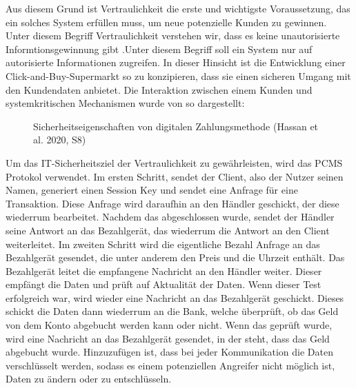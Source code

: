 Aus diesem Grund ist Vertraulichkeit die erste und wichtigste Voraussetzung, das ein solches System 
erfüllen muss, um neue potenzielle Kunden zu gewinnen. Unter diesem Begriff Vertraulichkeit verstehen wir, 
dass es keine unautorisierte Informtionsgewinnung gibt \cite{refbook:SWIS} .Unter diesem Begriff soll
ein System nur auf autorisierte Informationen zugreifen. In dieser Hinsicht ist die Entwicklung 
einer Click-and-Buy-Supermarkt so zu konzipieren, dass sie einen sicheren Umgang mit den Kundendaten
anbietet. Die Interaktion zwischen einem Kunden und systemkritischen Mechanismen wurde von
\cite{refart:HARE} so dargestellt:

\vfill
\begin{figure}[htb]
    \caption{Sicherheitseigenschaften von digitalen Zahlungsmethode (Hassan et al. 2020, S8)}
    \label{fig:refark_HARE}
\end{figure}
\vfill


Um das IT-Sicherheitsziel der Vertraulichkeit zu gewährleisten, wird das PCMS Protokol verwendet. 
Im ersten Schritt, sendet der Client, also der Nutzer seinen Namen, generiert einen Session Key 
und sendet eine Anfrage für eine Transaktion. Diese Anfrage wird daraufhin an den Händler geschickt,
der diese wiederrum bearbeitet. Nachdem das abgeschlossen wurde, sendet der Händler seine Antwort
an das Bezahlgerät, das wiederrum die Antwort an den Client weiterleitet. Im zweiten Schritt wird
die eigentliche Bezahl Anfrage an das Bezahlgerät gesendet, die unter anderem den Preis und die 
Uhrzeit enthält. Das Bezahlgerät leitet die empfangene Nachricht an den Händler weiter. 
Dieser empfängt die Daten und prüft auf Aktualität der Daten. Wenn dieser Test erfolgreich war, 
wird wieder eine Nachricht an das Bezahlgerät geschickt. Dieses schickt die Daten dann wiederrum 
an die Bank, welche überprüft, ob das Geld von dem Konto abgebucht werden kann oder nicht.
Wenn das geprüft wurde, wird eine Nachricht an das Bezahlgerät gesendet, in der steht, dass das
Geld abgebucht wurde. Hinzuzufügen ist, dass bei jeder Kommunikation die Daten verschlüsselt werden, 
sodass es einem potenziellen Angreifer nicht möglich ist, Daten zu ändern oder zu entschlüsseln.

